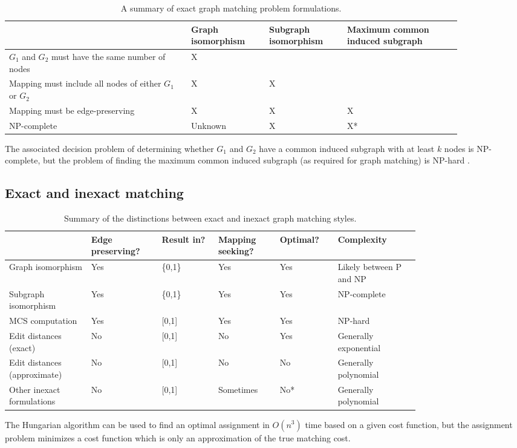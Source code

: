 \documentclass[12pt]{thesis}
\theoremstyle{plain}
\theoremstyle{definition}
\theoremstyle{remark}
\begin{document}
\begin{table}[t!]
\centering
\begin{tabular}{|L{0.35\linewidth}|L{0.15\linewidth}|L{0.15\linewidth}|L{0.22\linewidth}|}
\hline
 & Graph isomorphism & Subgraph isomorphism & Maximum common induced subgraph \\ \hline
$G_1$ and $G_2$ must have the same number of nodes & X & & \\ \hline
Mapping must include all nodes of either $G_1$ or $G_2$ & X & X & \\ \hline
Mapping must be edge-preserving & X & X & X \\ \hline
NP-complete & Unknown & X & X* \\ \hline
\end{tabular}
\flushleft\footnotesize *The associated decision problem of determining whether $G_1$ and $G_2$ have a common induced subgraph with at least $k$ nodes is NP-complete, but the problem of finding the maximum common induced subgraph (as required for graph matching) is NP-hard \cite{wikiMaximumCommonSubgraph}.
\caption{A summary of exact graph matching problem formulations.}
\label{NP_classifications}
\end{table}

\subsection{Exact and inexact matching}\label{section:exact_and_inexact_matching}

\begin{table}[t!]
\centering
\begin{tabular}{|L{0.16\linewidth}|L{0.13\linewidth}|L{0.11\linewidth}|L{0.12\linewidth}|L{0.105\linewidth}|L{0.165\linewidth}|}
\hline
 & Edge preserving? & Result in? & Mapping seeking? & Optimal? & Complexity \\ \hline
Graph isomorphism & Yes & \{0,1\} & Yes & Yes & Likely between P and NP \\ \hline
Subgraph isomorphism & Yes & \{0,1\} & Yes & Yes & NP-complete \\ \hline
MCS computation & Yes & [0,1] & Yes & Yes & NP-hard \\ \hline
Edit distances (exact) & No & [0,1] & No & Yes & Generally exponential \\ \hline
Edit distances (approximate) & No & [0,1] & No & No & Generally polynomial \\ \hline
Other inexact formulations & No & [0,1] & Sometimes & No* & Generally polynomial \\ \hline
\end{tabular}
\caption{Summary of the distinctions between exact and inexact graph matching styles.}
\flushleft\footnotesize *The Hungarian algorithm can be used to find an optimal assignment in $O(n^3)$ time based on a given cost function, but the assignment problem minimizes a cost function which is only an approximation of the true matching cost.
\label{exact_vs_inexact}
\end{table}
\end{document}
